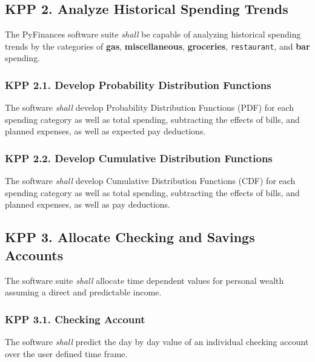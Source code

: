 \subsection{KPP 2. Analyze Historical Spending Trends}
The PyFinances software suite {\textit{shall}} be capable of analyzing historical
spending trends by the categories of {\textbf{gas}}, {\textbf{miscellaneous}}, 
{\textbf{groceries}}, {\texttt{restaurant}}, and {\textbf{bar}} spending.

\subsubsection{KPP 2.1. Develop Probability Distribution Functions}
The software {\textit{shall}} develop Probability Distribution Functions (PDF) for each 
spending category as well as total spending, subtracting the effects of bills, 
and planned expenses, as well as expected pay deductions.  

\subsubsection{KPP 2.2. Develop Cumulative Distribution Functions}
The software {\textit{shall}} develop Cumulative Distribution Functions (CDF) for
each spending category as well as total spending, subtracting the effects of bills, 
and planned expenses, as well as pay deductions.  

\subsection{KPP 3. Allocate Checking and Savings Accounts}
The software suite {\textit{shall}} allocate time dependent values for personal
wealth assuming a direct and predictable income.

\subsubsection{KPP 3.1. Checking Account}
The software {\textit{shall}} predict the day by day value of an individual 
checking account over the user defined time frame.

